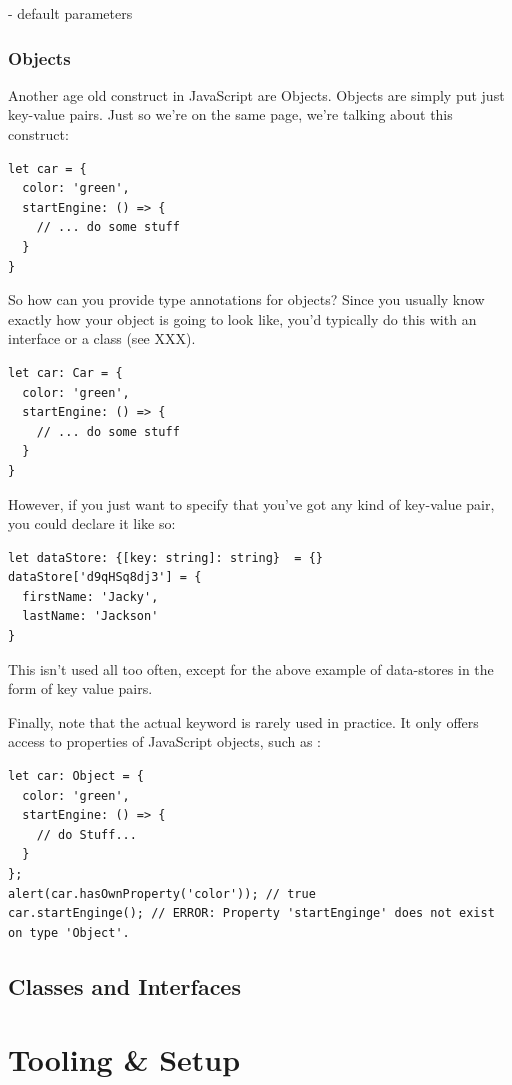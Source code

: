 \documentclass[12pt,a4paper]{report}
\newcommand{\code}[1]{\fbox{\texttt{#1}}}
\begin{document}
- default parameters

\subsection{Objects}
Another age old construct in JavaScript are Objects. Objects are simply put just key-value pairs. Just so we're on the same page, we're talking about this construct:
\begin{lstlisting}
let car = {
  color: 'green',
  startEngine: () => {
    // ... do some stuff
  }
}
\end{lstlisting}

So how can you provide type annotations for objects? Since you usually know exactly how your object is going to look like, you'd typically do this with an interface or a class (see XXX).
\begin{lstlisting}
let car: Car = {
  color: 'green',
  startEngine: () => {
    // ... do some stuff
  }
}
\end{lstlisting}

However, if you just want to specify that you've got any kind of key-value pair, you could declare it like so:
\begin{lstlisting}
let dataStore: {[key: string]: string}  = {}
dataStore['d9qHSq8dj3'] = {
  firstName: 'Jacky',
  lastName: 'Jackson'
}
\end{lstlisting}

This isn't used all too often, except for the above example of data-stores in the form of key value pairs.

Finally, note that the actual \code{Object} keyword is rarely used in practice. It only offers access to properties of JavaScript objects, such as \code{hasOwnProperty}:

\begin{lstlisting}
let car: Object = {
  color: 'green',
  startEngine: () => {
    // do Stuff...
  }
};
alert(car.hasOwnProperty('color')); // true
car.startEnginge(); // ERROR: Property 'startEnginge' does not exist on type 'Object'.
\end{lstlisting}



\section{Classes and Interfaces}



\chapter{Tooling \& Setup}
\end{document}
